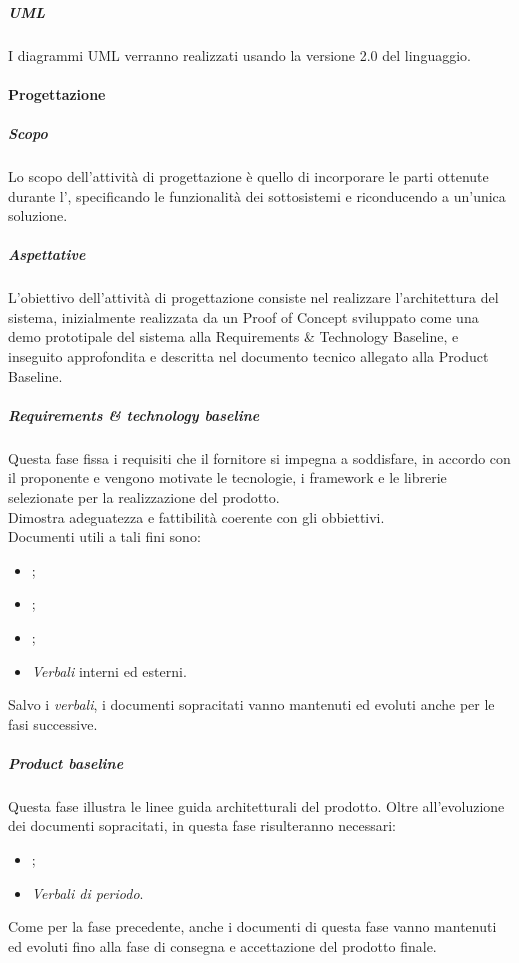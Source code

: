             \subparagraph{UML} \label{subparagraph:UML}
            I diagrammi UML\glo{} verranno realizzati usando la versione 2.0 del linguaggio.
          
        \paragraph{Progettazione} \label{paragraph:Progettazione}

            \subparagraph{Scopo} \label{subparagraph:Progettazione_Scopo}
            Lo scopo dell'attività di progettazione è quello di incorporare le parti ottenute durante l'\docNameAdRLow{}, specificando le funzionalità dei sottosistemi
            e riconducendo a un'unica soluzione. 

            \subparagraph{Aspettative} \label{subparagraph:Progettazione_Aspettative}
            L'obiettivo dell'attività di progettazione consiste nel realizzare l'architettura del sistema, inizialmente realizzata da un Proof of Concept\glo{} sviluppato come
            una demo prototipale del sistema alla Requirements \& Technology Baseline, e inseguito approfondita e descritta nel documento tecnico allegato alla Product Baseline.

            \subparagraph{Requirements \& technology baseline} \label{subparagraph:Requirements & technology baseline}
            Questa fase fissa i requisiti che il fornitore si impegna a soddisfare, in accordo con il proponente e vengono motivate le tecnologie,
            i framework\glo{} e le librerie selezionate per la realizzazione del prodotto.\\
            Dimostra adeguatezza e fattibilità coerente con gli obbiettivi.\\
            Documenti utili a tali fini sono:
            \begin{itemize}
                \item \docNamePdP{};
                \item \docNamePdQ{};
                \item \docNameNdP{};
                \item \textit{Verbali} interni ed esterni.
            \end{itemize}
            Salvo i \textit{verbali}, i documenti sopracitati vanno mantenuti ed evoluti anche per le fasi successive.\\


            \subparagraph{Product baseline} \label{subparagraph:Product_baseline}
            Questa fase illustra le linee guida architetturali del prodotto.
            Oltre all'evoluzione dei documenti sopracitati, in questa fase risulteranno necessari:
            \begin{itemize}
                \item \docNameMU{};
                \item \textit{Verbali di periodo}.
            \end{itemize}
            Come per la fase precedente, anche i documenti di questa fase vanno mantenuti ed evoluti fino alla fase di consegna e accettazione del prodotto finale.


